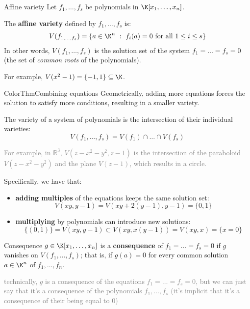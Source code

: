 \documentclass[a4paper, 11pt]{report}
\begin{document}
\begin{defframe}{Affine variety}{}
    Let $f_{1}, \dots, f_{s}$ be polynomials in $\K[x_{1}, \dots, x_{n}]$.

    The \textbf{affine variety} defined by $f_{1}, \dots, f_{s}$ is:
    $$
V(f_{1, \dots, f_{s}}) = \{ a\in \K^{n} \ : \ f_{i}(a) = 0 \text{ for all } 1 \leq i \leq s\}
    $$
    In other words, $V(f_{1}, \dots, f_{s})$ is the solution set of the system $f_{1} = \dots = f_{s} = 0$ (the set of \textit{common roots} of the polynomials).
\end{defframe}

For example, $V(x^{2} -1) = \{-1, 1\}\subseteq \K$.

\begin{cframe}{ColorThm}{Combining equations}    
Geometrically, adding more equations forces the solution to satisfy more conditions, resulting in a smaller variety. 

The variety of a system of polynomials is the intersection of their individual varieties:
$$V(f_{1}, \dots, f_{s}) = V(f_{1}) \cap \dots \cap V(f_{s})$$

\textcolor{gray}{For example, in $\mathbb{R}^{3}$, $V(z - x^{2} - y^{2}, z - 1)$ is the intersection of the paraboloid $V(z - x^{2} - y^{2})$ and the plane $V(z - 1)$, which results in a circle.}

Specifically, we have that:
    \begin{itemize}
        \item \textbf{adding multiples} of the equations keeps the same solution set:
            $$
            V(xy, y-1) = V(xy + 2(y-1), y-1) = \{0, 1\}
            $$

        \item \textbf{multiplying} by polynomials can introduce new solutions:
$$
\{(0,1)\} = V(xy, y-1) \subset V(xy, x(y-1)) = V(xy, x) = \{x = 0\}
$$
    \end{itemize}
\end{cframe}

\begin{defframe}{Consequence}{}
    $g \in \K[x_{1}, \dots, x_{n}]$ is a \textbf{consequence} of $f_{1} = \dots = f_{s} = 0$ if $g$ vanishes on $V(f_{1}, \dots, f_{s})$; that is, if $g(a) = 0$ for every common solution $a \in \K^{n}$ of $f_{1}, \dots, f_{n}$.

    \textcolor{gray}{technically, $g$ is a consequence of the equations $f_1 = \dots = f_s = 0$, but we can just say that it's a consequence of the polynomials $f_1, \dots, f_s$ (it's implicit that it's a consequence of their being equal to 0)}
\end{defframe}
\end{document}
